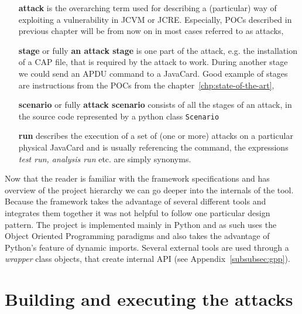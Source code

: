                 \begin{enumerate}
                    \item[\textbf{attack}] is the overarching term used for describing a (particular) way of exploiting a vulnerability in JCVM or JCRE\@. Especially, POCs described in previous chapter will be from now on in most cases referred to as attacks,
                    \item[\textbf{stage}] or fully \textbf{an attack stage} is one part of the attack, e.g. the installation of a CAP file, that is required by the attack to work. During another stage we could send an APDU command to a JavaCard. Good example of stages are instructions from the POCs from the chapter~\ref{chp:state-of-the-art},
                    \item[\textbf{scenario}] or fully \textbf{attack scenario} consists of all the stages of an attack, in the source code represented by a python class \texttt{Scenario}
                    \item[\textbf{run}] describes the execution of a set  of (one or more) attacks on a particular physical JavaCard and is usually referencing the \javusrun command, the expressions \textit{test run, analysis run} etc. are simply synonyms.
                \end{enumerate}

        

        Now that the reader is familiar with the framework specifications and has overview of the project hierarchy we can go deeper into the internals of the tool. Because the framework takes the advantage of several different tools and integrates them together it was not helpful to follow one particular design pattern. The project is implemented mainly in Python and as such uses the Object Oriented Programming paradigms and also takes the advantage of Python's feature of dynamic imports. Several external tools are used through a \textit{wrapper} class objects, that create internal API (see Appendix~\ref{subsubsec:gpp}).


    \section{Building and executing the attacks}\label{sec:build-execute-attacks}

